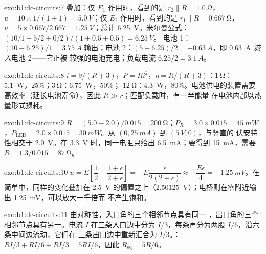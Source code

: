 \begin{solution}{exo:b1:dc-circuits:7}
叠加：仅 $E_1$ 作用时，看到的是 $r_2 \parallel R = \qty{1.0}{\ohm}$，
$u = 10 \times 1/(1 + 1) = \qty{5.0}{V}$；仅 $E_2$ 作用时，看到的是 $r_1 \parallel R
= \qty{0.667}{\ohm}$，$u = 5 \times 0.667/2.667 = \qty{1.25}{V}$；总计
\qty{6.25}{V}。米尔曼公式：$(10/1 + 5/2 + 0/2)/(1 + 0.5 + 0.5) = \qty{6.25}{V}$。
电池 1：$(10 - 6.25)/1 = \qty{3.75}{A}$ 输出；电池 2：$(5 - 6.25)/2
= \qty{-0.63}{A}$，即 \qty{0.63}{A} \emph{流入}电池 2——它正被
较强的电池充电；负载电流 $6.25/2 = \qty{3.1}{A}$。
\end{solution}

\begin{solution}{exo:b1:dc-circuits:8}
$i = 9/(R + 3)$，$P = Ri^2$，$\eta = R/(R + 3)$：$\qty{1}{\ohm}$：
\qty{5.1}{W}，$25\%$；$\qty{3}{\ohm}$：\qty{6.75}{W}，$50\%$；
$\qty{12}{\ohm}$：\qty{4.3}{W}，$80\%$。电池供电的装置需要
高效率（延长电池寿命），因此 $R \gg r$；匹配负载时，有一半能量
在电池内部以热量形式损耗。
\end{solution}

\begin{solution}{exo:b1:dc-circuits:9}
$R = (5.0 - 2.0)/0.015 = \qty{200}{\ohm}$；$P_R = 3.0 \times 0.015 =
\qty{45}{mW}$，$P_{\mathrm{LED}} = 2.0 \times 0.015 = \qty{30}{mW}$。从 $(0, \qty{25}{mA})$ 到 $(\qty{5}{V}, 0)$，与竖直的
伏安特性相交于 \qty{2.0}{V}。在 \qty{3.3}{V} 时，同一电阻只给出
\qty{6.5}{mA}；要得到 \qty{15}{mA}，需要 $R = 1.3/0.015 =
\qty{87}{\ohm}$。
\end{solution}

\begin{solution}{exo:b1:dc-circuits:10}
$u = E\left[\dfrac12 - \dfrac{1 + \epsilon}{2 + \epsilon}\right] =
-E\dfrac{\epsilon}{2(2 + \epsilon)} \approx -\dfrac{E\epsilon}{4} =
\qty{-1.25}{mV}$。在简单中，同样的变化叠加在
\qty{2.5}{V} 的偏置之上（\qty{2.50125}{V}）；电桥则在零附近输出
\qty{1.25}{mV}，可以放大一千倍而
不产生饱和。
\end{solution}

\begin{solution}{exo:b1:dc-circuits:11}
由对称性，入口角的三个相邻节点具有同一
，出口角的三个相邻节点具有另一。电流
$I$ 在三条入口边中分为 $I/3$，每条再分为两股
$I/6$，沿六条中间边流动，它们在
三条出口边中重新汇合为 $I/3$。：$RI/3 + RI/6 + RI/3 = 5RI/6$，因此
$R_{\mathrm{eq}} = 5R/6$。
\end{solution}

